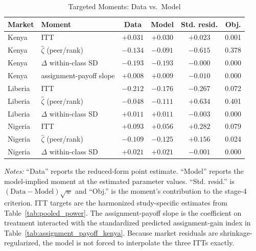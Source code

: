 \begin{table}[H]
\centering
\caption{Targeted Moments: Data vs.\ Model}
\label{tab:moment_fit}
\begin{threeparttable}
\scriptsize
\setlength{\tabcolsep}{4pt}
\begin{tabular}[t]{llcccc}
\toprule
Market & Moment & Data & Model & Std. resid. & Obj. \\
\midrule
Kenya & ITT & $+0.031$ & $+0.030$ & $+0.023$ & 0.001 \\
Kenya & $\hat{\zeta}$ (peer/rank) & $-0.134$ & $-0.091$ & $-0.615$ & 0.378 \\
Kenya & $\Delta$ within-class SD & $-0.193$ & $-0.193$ & $-0.000$ & 0.000 \\
Kenya & assignment-payoff slope & $+0.008$ & $+0.009$ & $-0.010$ & 0.000 \\
\addlinespace
Liberia & ITT & $-0.212$ & $-0.176$ & $-0.267$ & 0.072 \\
Liberia & $\hat{\zeta}$ (peer/rank) & $-0.048$ & $-0.111$ & $+0.634$ & 0.401 \\
Liberia & $\Delta$ within-class SD & $+0.011$ & $+0.011$ & $-0.003$ & 0.000 \\
\addlinespace
Nigeria & ITT & $+0.093$ & $+0.056$ & $+0.282$ & 0.079 \\
Nigeria & $\hat{\zeta}$ (peer/rank) & $-0.109$ & $-0.125$ & $+0.156$ & 0.024 \\
Nigeria & $\Delta$ within-class SD & $+0.021$ & $+0.021$ & $-0.001$ & 0.000 \\
\bottomrule
\end{tabular}
\begin{tablenotes}
\footnotesize
\item \textit{Notes:} ``Data'' reports the reduced-form point estimate. ``Model'' reports the model-implied moment at the estimated parameter values. ``Std. resid.'' is $(\text{Data}-\text{Model})\sqrt{w}$ and ``Obj.'' is the moment's contribution to the stage-4 criterion. ITT targets are the harmonized study-specific estimates from Table~\ref{tab:pooled_power}. The assignment-payoff slope is the coefficient on treatment interacted with the standardized predicted assignment-gain index in Table~\ref{tab:assignment_payoff_kenya}. Because market residuals are shrinkage-regularized, the model is not forced to interpolate the three ITTs exactly.
\end{tablenotes}
\end{threeparttable}
\end{table}
